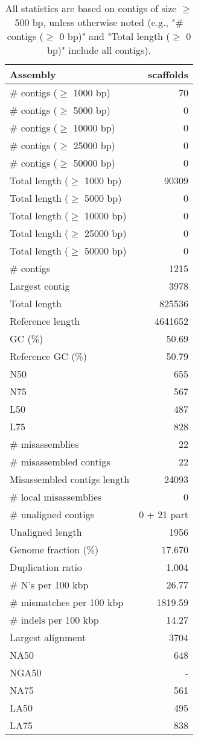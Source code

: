 \documentclass[12pt,a4paper]{article}
\begin{document}
\begin{table}[ht]
\begin{center}
\caption{All statistics are based on contigs of size $\geq$ 500 bp, unless otherwise noted (e.g., "\# contigs ($\geq$ 0 bp)" and "Total length ($\geq$ 0 bp)" include all contigs).}
\begin{tabular}{|l*{1}{|r}|}
\hline
Assembly & scaffolds \\ \hline
\# contigs ($\geq$ 1000 bp) & 70 \\ \hline
\# contigs ($\geq$ 5000 bp) & 0 \\ \hline
\# contigs ($\geq$ 10000 bp) & 0 \\ \hline
\# contigs ($\geq$ 25000 bp) & 0 \\ \hline
\# contigs ($\geq$ 50000 bp) & 0 \\ \hline
Total length ($\geq$ 1000 bp) & 90309 \\ \hline
Total length ($\geq$ 5000 bp) & 0 \\ \hline
Total length ($\geq$ 10000 bp) & 0 \\ \hline
Total length ($\geq$ 25000 bp) & 0 \\ \hline
Total length ($\geq$ 50000 bp) & 0 \\ \hline
\# contigs & 1215 \\ \hline
Largest contig & 3978 \\ \hline
Total length & 825536 \\ \hline
Reference length & 4641652 \\ \hline
GC (\%) & 50.69 \\ \hline
Reference GC (\%) & 50.79 \\ \hline
N50 & 655 \\ \hline
N75 & 567 \\ \hline
L50 & 487 \\ \hline
L75 & 828 \\ \hline
\# misassemblies & 22 \\ \hline
\# misassembled contigs & 22 \\ \hline
Misassembled contigs length & 24093 \\ \hline
\# local misassemblies & 0 \\ \hline
\# unaligned contigs & 0 + 21 part \\ \hline
Unaligned length & 1956 \\ \hline
Genome fraction (\%) & 17.670 \\ \hline
Duplication ratio & 1.004 \\ \hline
\# N's per 100 kbp & 26.77 \\ \hline
\# mismatches per 100 kbp & 1819.59 \\ \hline
\# indels per 100 kbp & 14.27 \\ \hline
Largest alignment & 3704 \\ \hline
NA50 & 648 \\ \hline
NGA50 & - \\ \hline
NA75 & 561 \\ \hline
LA50 & 495 \\ \hline
LA75 & 838 \\ \hline
\end{tabular}
\end{center}
\end{table}
\end{document}
